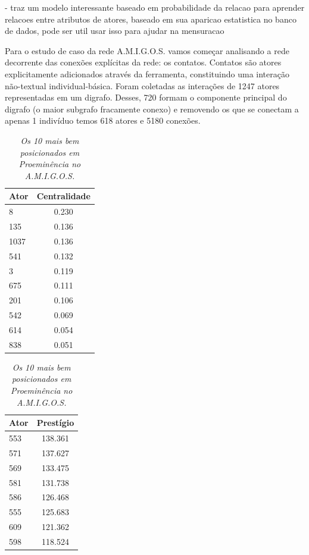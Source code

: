 \documentclass{article}
\begin{document}
\cite{Friedman1999} - traz um modelo interessante baseado em probabilidade da
relacao para aprender relacoes entre atributos de atores, baseado em sua
aparicao estatistica no banco de dados, pode ser util usar isso para ajudar na
mensuracao

\begin{table}[htbp]
	\begin{boxedminipage}{\textwidth}
Para o estudo de caso da rede A.M.I.G.O.S. vamos começar analisando a rede
decorrente das conexões explícitas da rede: os contatos. Contatos são atores
explicitamente adicionados através da ferramenta, constituindo uma interação
não-textual individual-básica. Foram coletadas as interações de 1247 atores
representadas em um digrafo. Desses, 720 formam o componente principal do
digrafo (o maior subgrafo fracamente conexo) e removendo os que se conectam a
apenas 1 indivíduo temos 618 atores e 5180 conexões.
		\large       %
		\setlength{\arrayrulewidth}{2\arrayrulewidth}  %
		\setlength{\belowcaptionskip}{10pt}  %
		\caption{\it Os 10 mais bem posicionados em Proeminência no A.M.I.G.O.S.}
		\centering   %
		\begin{tabular}{| l | c |}
			\hline
			Ator & Centralidade \\ \hline
			8 & 0.230 \\
			135 & 0.136 \\
			1037 & 0.136 \\
			541 & 0.132 \\
			3 & 0.119 \\
			675 & 0.111 \\
			201 & 0.106 \\
			542 & 0.069 \\
			614 & 0.054 \\
			838 & 0.051\\
			\hline
		\end{tabular}
		\begin{tabular}{| l | c |}
			\hline
			Ator & Prestígio \\ \hline
			553 & 138.361 \\
			571 & 137.627 \\
			569 & 133.475 \\
			581 & 131.738 \\
			586 & 126.468 \\
			555 & 125.683 \\
			609 & 121.362 \\
			598 & 118.524 \\

\end{tabular}
\end{boxedminipage}
\end{table}
\end{document}
